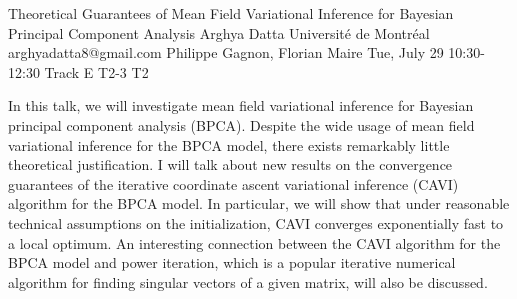 \begin{talk}
  {Theoretical Guarantees of Mean Field Variational Inference for Bayesian Principal Component Analysis}%
  {Arghya Datta}%
  {Université de Montréal}%
  {arghyadatta8@gmail.com}%
  {Philippe Gagnon, Florian Maire}%
  {}%
  {Tue, July 29 10:30-12:30 Track E}%
  {T2-3}%
  {T2}%
  
				
			
In this talk, we will investigate mean field variational inference for Bayesian principal component analysis (BPCA). Despite the wide usage of mean field variational inference for the BPCA model, there exists remarkably little theoretical justification. I will talk about new results on the convergence guarantees of the iterative coordinate ascent variational inference (CAVI) algorithm for the BPCA model. In particular, we will show that under reasonable technical assumptions on the initialization, CAVI converges exponentially fast to a local optimum. An interesting connection between the CAVI algorithm for the BPCA model and power iteration, which is a popular iterative numerical algorithm for finding singular vectors of a given matrix, will also be discussed.


\end{talk}

